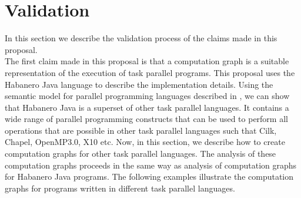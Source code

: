 \section{Validation}

In this section we describe the validation process of the claims made in this proposal.\\

The first claim made in this proposal is that a computation graph is a suitable representation of the execution of task parallel programs. This proposal uses the Habanero Java language to describe the implementation details. Using the semantic model for parallel programming languages described in \cite{bouajjani2012analysis}, we can show that Habanero Java is a superset of other task parallel languages. It contains a wide range of parallel programming constructs that can be used to perform all operations that are possible in other task parallel languages such that Cilk, Chapel, OpenMP3.0, X10 etc. Now, in this section, we describe how to create computation graphs for other task parallel languages. The analysis of these computation graphs proceeds in the same way as analysis of computation graphs for Habanero Java programs. The following examples illustrate the computation graphs for programs written in different task parallel languages.

